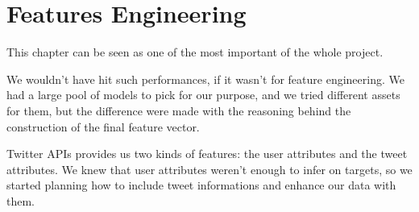 \chapter{Features Engineering}
\label{capitolo4}
\thispagestyle{empty}

This chapter can be seen as one of the most important of the whole project.

We wouldn't have hit such performances, if it wasn't for feature engineering. We had a large pool of models to pick for our purpose,  and we tried different assets for them, but the difference were made with the reasoning behind the construction of the final feature vector.

Twitter APIs provides us two kinds of features: the user attributes and the tweet attributes.
We knew that user attributes weren't enough to infer on targets, so we started planning how to include tweet informations and enhance our data with them.


